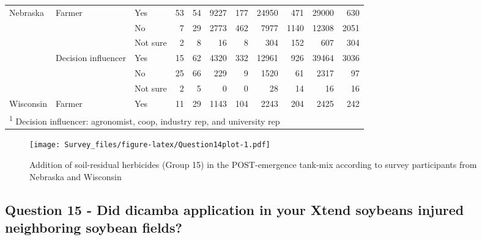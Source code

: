\documentclass[]{article}
\begin{document}
\begin{landscape}
\begin{table}[!h]
\begin{tabular}[t]{lllrrrrrrrr}
\multirow{-6}{*}{\raggedright\arraybackslash Nebraska} & \multirow{-3}{*}{\raggedright\arraybackslash Farmer} & Yes & 53 & 54 & 9227 & 177 & 24950 & 471 & 29000 & 630\\
\cmidrule{1-11}
 &  & No & 7 & 29 & 2773 & 462 & 7977 & 1140 & 12308 & 2051\\

 &  & Not sure & 2 & 8 & 16 & 8 & 304 & 152 & 607 & 304\\

 & \multirow{-3}{*}{\raggedright\arraybackslash Decision influencer} & Yes & 15 & 62 & 4320 & 332 & 12961 & 926 & 39464 & 3036\\

 &  & No & 25 & 66 & 229 & 9 & 1520 & 61 & 2317 & 97\\

 &  & Not sure & 2 & 5 & 0 & 0 & 28 & 14 & 16 & 16\\

\multirow{-6}{*}{\raggedright\arraybackslash Wisconsin} & \multirow{-3}{*}{\raggedright\arraybackslash Farmer} & Yes & 11 & 29 & 1143 & 104 & 2243 & 204 & 2425 & 242\\
\bottomrule
\multicolumn{11}{l}{\textsuperscript{1} Decision influencer: agronomist, coop, industry rep, and university rep}\\
\end{tabular}
\end{table}
\end{landscape}

\begin{figure}
\centering
\texttt{[image: Survey\_files/figure-latex/Question14plot-1.pdf]}
\caption{Addition of soil-residual herbicides (Group 15) in the
POST-emergence tank-mix according to survey participants from Nebraska
and Wisconsin}
\end{figure}

\newpage

\subsection{Question 15 - Did dicamba application in your Xtend soybeans
injured neighboring soybean
fields?}\label{question-15---did-dicamba-application-in-your-xtend-soybeans-injured-neighboring-soybean-fields}
\end{document}
